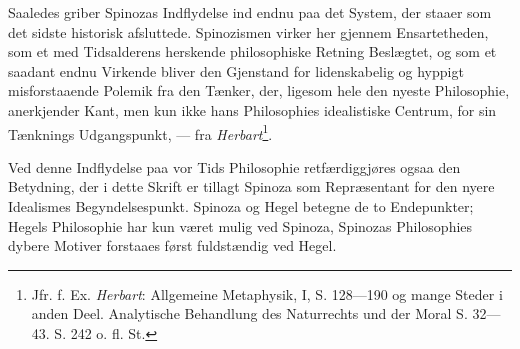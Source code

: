 \documentclass[12pt,a4paper]{book}
\begin{document}
Saaledes griber Spinozas Indflydelse ind endnu paa det
System, der staaer som det sidste historisk afsluttede. Spinozismen
virker her gjennem Ensartetheden, som et med
Tidsalderens herskende philosophiske Retning Beslægtet, og
som et saadant endnu Virkende bliver den Gjenstand for lidenskabelig
og hyppigt misforstaaende Polemik fra den Tænker,
der, ligesom hele den nyeste Philosophie, anerkjender Kant,
men kun ikke hans Philosophies idealistiske Centrum, for
sin Tænknings Udgangspunkt, --- fra \emph{Herbart}\footnote{Jfr. f. Ex. \emph{Herbart}: Allgemeine Metaphysik, I, S. 128---190 og
mange Steder i anden Deel. Analytische Behandlung des Naturrechts
und der Moral S. 32---43. S. 242 o. fl. St.}.

Ved denne Indflydelse paa vor Tids Philosophie retfærdiggjøres
ogsaa den Betydning, der i dette Skrift er tillagt
Spinoza som Repræsentant for den nyere Idealismes
Begyndelsespunkt. Spinoza og Hegel betegne de to Endepunkter;
Hegels Philosophie har kun været mulig ved Spinoza,
Spinozas Philosophies dybere Motiver forstaaes først
fuldstændig ved Hegel.

\end{document}
